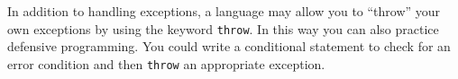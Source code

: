 In addition to handling exceptions, a language may allow you
to ``throw'' your own exceptions by using the keyword 
\texttt{throw}.
In this way you can also practice defensive programming.
You could write a conditional statement to check for an error
condition and then \texttt{throw} an appropriate exception.



